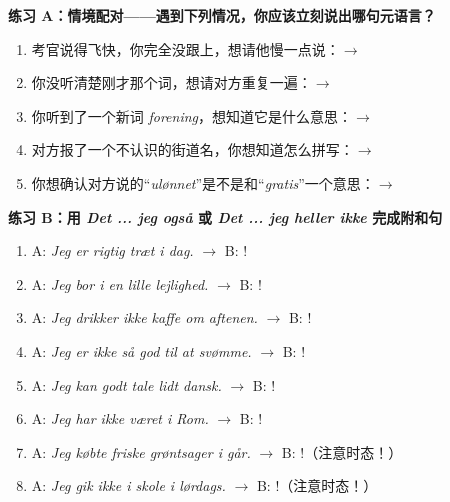 \textbf{练习 A：情境配对——遇到下列情况，你应该立刻说出哪句元语言？}
\begin{enumerate}
  \item 考官说得飞快，你完全没跟上，想请他慢一点说：$\rightarrow$ \underline{\hspace{5.5cm}}
  \item 你没听清楚刚才那个词，想请对方重复一遍：$\rightarrow$ \underline{\hspace{5.5cm}}
  \item 你听到了一个新词 \textit{forening}，想知道它是什么意思：$\rightarrow$ \underline{\hspace{5.5cm}}
  \item 对方报了一个不认识的街道名，你想知道怎么拼写：$\rightarrow$ \underline{\hspace{5.5cm}}
  \item 你想确认对方说的“\textit{ulønnet}”是不是和“\textit{gratis}”一个意思：$\rightarrow$ \underline{\hspace{5.5cm}}
\end{enumerate}

\textbf{练习 B：用 \textit{Det ... jeg også} 或 \textit{Det ... jeg heller ikke} 完成附和句}
\begin{enumerate}
  \item A: \textit{Jeg er rigtig træt i dag.} $\rightarrow$ B: \underline{\hspace{4.5cm}}!
  \item A: \textit{Jeg bor i en lille lejlighed.} $\rightarrow$ B: \underline{\hspace{4.5cm}}!
  \item A: \textit{Jeg drikker ikke kaffe om aftenen.} $\rightarrow$ B: \underline{\hspace{4.5cm}}!
  \item A: \textit{Jeg er ikke så god til at svømme.} $\rightarrow$ B: \underline{\hspace{4.5cm}}!
  \item A: \textit{Jeg kan godt tale lidt dansk.} $\rightarrow$ B: \underline{\hspace{4.5cm}}!
  \item A: \textit{Jeg har ikke været i Rom.} $\rightarrow$ B: \underline{\hspace{4.5cm}}!
  \item A: \textit{Jeg købte friske grøntsager i går.} $\rightarrow$ B: \underline{\hspace{4.5cm}}!（注意时态！）
  \item A: \textit{Jeg gik ikke i skole i lørdags.} $\rightarrow$ B: \underline{\hspace{4.5cm}}!（注意时态！）
\end{enumerate}


